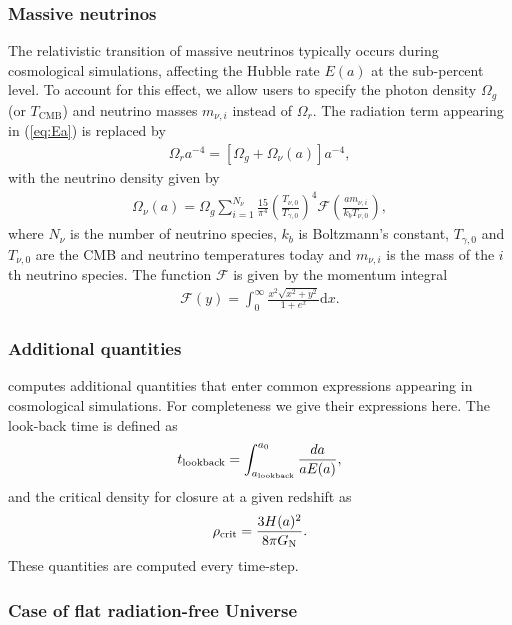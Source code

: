 \subsubsection{Massive neutrinos}

The relativistic transition of massive neutrinos typically occurs during
cosmological simulations, affecting the Hubble rate $E(a)$ at the sub-percent
level. To account for this effect, we allow users to specify the photon density $\Omega_g$
(or $T_\text{CMB}$) and neutrino masses $m_{\nu,i}$ instead of $\Omega_r$.
The radiation term appearing in (\ref{eq:Ea}) is replaced by
\begin{align}
    \Omega_r a^{-4} = \left[\Omega_g + \Omega_\nu(a)\right] a^{-4},
\end{align}
with the neutrino density given by \citep{Zennaro2016}
\begin{align}
    \Omega_\nu(a) = \Omega_g \sum_{i=1}^{N_\nu}\frac{15}{\pi^4}\left(\frac{T_{\nu,0}}{T_{\gamma,0}}\right)^4 \mathcal{F}\left(\frac{a m_{\nu,i}}{k_b T_{\nu,0}}\right),
\end{align}
where $N_\nu$ is the number of neutrino species, $k_b$ is Boltzmann's constant, $T_{\gamma,0}$ and $T_{\nu,0}$ are the CMB and neutrino temperatures today and $m_{\nu,i}$ is the mass of the $i$th neutrino species. The function $\mathcal{F}$ is given by the momentum integral
%
\begin{align}
    \mathcal{F}(y) = \int_0^{\infty} \frac{x^2\sqrt{x^2+y^2}}{1+e^{x}}\mathrm{d}x.
\end{align}



\subsubsection{Additional quantities}

\swift computes additional quantities that enter common expressions appearing in
cosmological simulations. For completeness we give their expressions here. The
look-back time is defined as
\begin{equation}
  t_{\rm lookback} = \int_{a_{\rm lookback}}^{a_0} \frac{da}{a E(a)},
\end{equation}
and the critical density for closure at a given redshift as
\begin{equation}
  \rho_{\rm crit} = \frac{3H(a)^2}{8\pi G_{\rm{N}}}.
\end{equation}
These quantities are computed every time-step.

\subsubsection{Case of flat radiation-free Universe}

